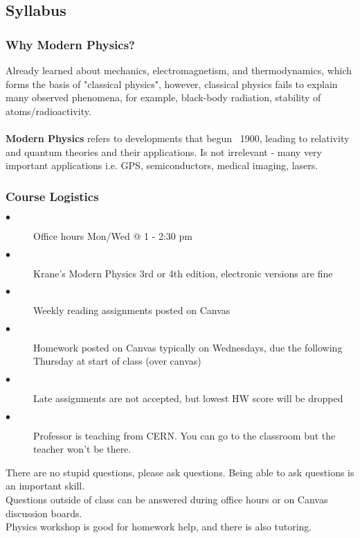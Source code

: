 \documentclass[class=article,crop=false]{standalone}
\begin{document}
\lecture
\subsection{Syllabus}
\subsubsection{Why Modern Physics?}
Already learned about mechanics, electromagnetism, and thermodynamics, which forms the basis of "classical physics", however, classical physics fails to explain many observed phenomena, for example, black-body radiation, stability of atoms/radioactivity. \\\\
\textbf{Modern Physics} refers to developments that begun ~1900, leading to relativity and quantum theories and their applications. Is not irrelevant - many very important applications i.e. GPS, semiconductors, medical imaging, lasers. \\

\subsubsection{Course Logistics}
\begin{description}
	\item [$\bullet$] Office hours Mon/Wed @ 1 - 2:30 pm
	\item [$\bullet$] Krane's Modern Physics 3rd or 4th edition, electronic versions are fine
	\item [$\bullet$] Weekly reading assignments posted on Canvas
	\item [$\bullet$] Homework posted on Canvas typically on Wednesdays, due the following Thursday at start of class (over canvas)
	\item [$\bullet$] Late assignments are not accepted, but lowest HW score will be dropped
	\item [$\bullet$] Professor is teaching from CERN. You can go to the classroom but the teacher won't be there.
\end{description}

There are no stupid questions, please ask questions. Being able to ask questions is an important skill. \\
Questions outside of class can be answered during office hours or on Canvas discussion boards. \\
Physics workshop is good for homework help, and there is also tutoring.\\
\end{document}
